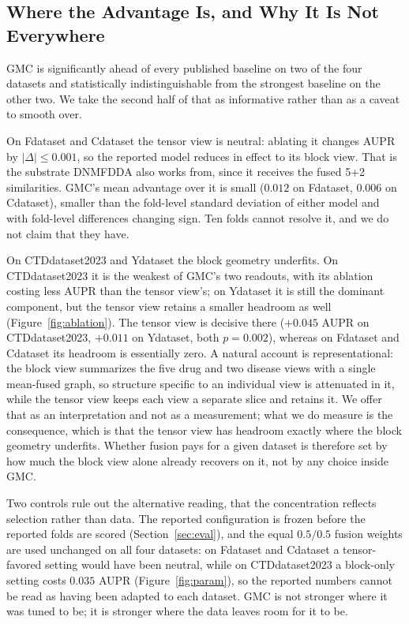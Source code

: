 \documentclass[webpdf,modern,large]{oup-authoring-template}
\begin{document}
\subsection{Where the Advantage Is, and Why It Is Not Everywhere}

GMC is significantly ahead of every published baseline on two of the four datasets and statistically indistinguishable from the strongest baseline on the other two. We take the second half of that as informative rather than as a caveat to smooth over.

On Fdataset and Cdataset the tensor view is neutral: ablating it changes AUPR by $|\Delta|\le0.001$, so the reported model reduces in effect to its block view. That is the substrate DNMFDDA also works from, since it receives the fused 5+2 similarities. GMC's mean advantage over it is small ($0.012$ on Fdataset, $0.006$ on Cdataset), smaller than the fold-level standard deviation of either model and with fold-level differences changing sign. Ten folds cannot resolve it, and we do not claim that they have.

On CTDdataset2023 and Ydataset the block geometry underfits. On CTDdataset2023 it is the weakest of GMC's two readouts, with its ablation costing less AUPR than the tensor view's; on Ydataset it is still the dominant component, but the tensor view retains a smaller headroom as well (Figure~\ref{fig:ablation}). The tensor view is decisive there ($+0.045$ AUPR on CTDdataset2023, $+0.011$ on Ydataset, both $p=0.002$), whereas on Fdataset and Cdataset its headroom is essentially zero. A natural account is representational: the block view summarizes the five drug and two disease views with a single mean-fused graph, so structure specific to an individual view is attenuated in it, while the tensor view keeps each view a separate slice and retains it. We offer that as an interpretation and not as a measurement; what we do measure is the consequence, which is that the tensor view has headroom exactly where the block geometry underfits. Whether fusion pays for a given dataset is therefore set by how much the block view alone already recovers on it, not by any choice inside GMC.

Two controls rule out the alternative reading, that the concentration reflects selection rather than data. The reported configuration is frozen before the reported folds are scored (Section~\ref{sec:eval}), and the equal $0.5/0.5$ fusion weights are used unchanged on all four datasets: on Fdataset and Cdataset a tensor-favored setting would have been neutral, while on CTDdataset2023 a block-only setting costs $0.035$ AUPR (Figure~\ref{fig:param}), so the reported numbers cannot be read as having been adapted to each dataset. GMC is not stronger where it was tuned to be; it is stronger where the data leaves room for it to be.
\end{document}

